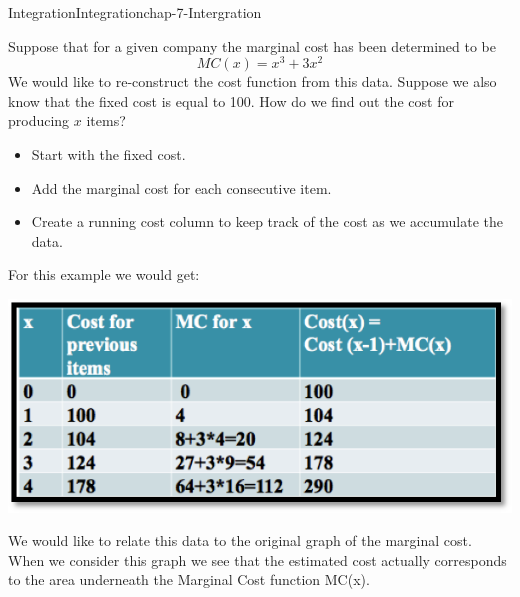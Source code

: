 \documentclass[oneside,10pt,]{book}
\numberwithin{equation}{section}
\begin{document}
\begin{chapterptx}{Integration}{}{Integration}{}{}{chap-7-Intergration}
\begin{introduction}{}%
\hypertarget{p-2534}{}%
Suppose that for a given company the marginal cost has been determined to be%
%
\begin{equation*}
MC(x)=x^3+3x^2
\end{equation*}
\hypertarget{p-2535}{}%
We would like to re-construct the cost function from this data. Suppose we also know that the fixed cost is equal to \textdollar{}100. How do we find out the cost for producing \(x\) items?%
\leavevmode%
\begin{itemize}[label=\textbullet]
\item{}\hypertarget{p-2536}{}%
Start with the fixed cost.%
\item{}\hypertarget{p-2537}{}%
Add the marginal cost for each consecutive item.%
\item{}\hypertarget{p-2538}{}%
Create a running cost column to keep track of the cost as we accumulate the data.%
\end{itemize}
\hypertarget{p-2539}{}%
For this example we would get:%
\begin{sidebyside}{1}{0.1}{0.1}{0}%
\begin{sbspanel}{0.8}%
\includegraphics[width=1\linewidth]{images/sec7-0-1.png}
\end{sbspanel}%
\end{sidebyside}%
\par
\hypertarget{p-2540}{}%
We would like to relate this data to the original graph of the marginal cost. When we consider this graph we see that the estimated cost actually corresponds to the area underneath the Marginal Cost function MC(x).%
\begin{sidebyside}{1}{0.2}{0.2}{0}%
\begin{sbspanel}{0.6}%

\end{sbspanel}
\end{sidebyside}
\end{introduction}
\end{chapterptx}
\end{document}
